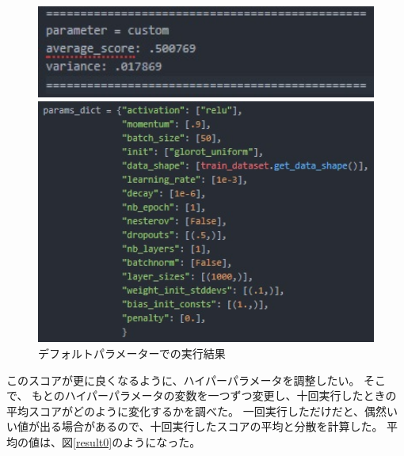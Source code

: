 \documentclass[a4j,11pt]{jarticle}
\begin{document}
\begin{figure}
	\begin{minipage}{0.50\hsize}
		\begin{center}
			\includegraphics[width=12cm, bb=0 0 298 81]{original.jpg}
		\end{center}
	\end{minipage}
	\begin{minipage}{0.50\hsize}
		\begin{center}
			\includegraphics[width=12cm, bb=0 0 387 278]{originalp.jpg}
		\end{center}
	\end{minipage}
	\caption{デフォルトパラメーターでの実行結果}
	\label{fig1}
\end{figure}


このスコアが更に良くなるように、ハイパーパラメータを調整したい。
そこで、
もとのハイパーパラメータの変数を一つずつ変更し、十回実行したときの平均スコアがどのように変化するかを調べた。
一回実行しただけだと、偶然いい値が出る場合があるので、十回実行したスコアの平均と分散を計算した。
平均の値は、図\ref{result0}のようになった。
\end{document}
